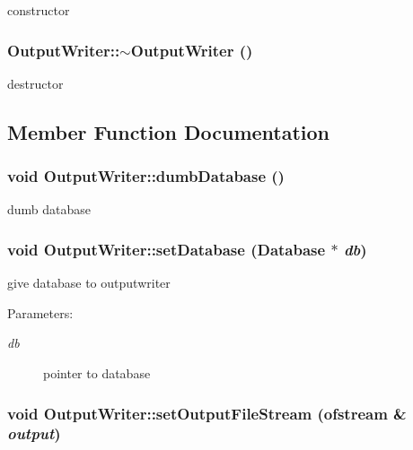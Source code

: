 constructor 

\subsubsection[$\sim$OutputWriter]{\setlength{\rightskip}{0pt plus 5cm}OutputWriter::$\sim$OutputWriter ()}\label{classOutputWriter_71dbdbda45b86730f78df2b08095ee64}


destructor 



\subsection{Member Function Documentation}
\subsubsection[dumbDatabase]{\setlength{\rightskip}{0pt plus 5cm}void OutputWriter::dumbDatabase ()}\label{classOutputWriter_f664a428bb441a196c26392daa87f07e}


dumb database 
\subsubsection[setDatabase]{\setlength{\rightskip}{0pt plus 5cm}void OutputWriter::setDatabase ({\bf Database} $\ast$ {\em db})}\label{classOutputWriter_fe4c02f7ba88124d12a08c8fd718ec5d}


give database to outputwriter \begin{Desc}
\item[Parameters:]
\begin{description}
\item[{\em db}]pointer to database \end{description}
\end{Desc}
\subsubsection[setOutputFileStream]{\setlength{\rightskip}{0pt plus 5cm}void OutputWriter::setOutputFileStream (ofstream \& {\em output})}\label{classOutputWriter_de185d0277e22accdc64e0ea13029596}


